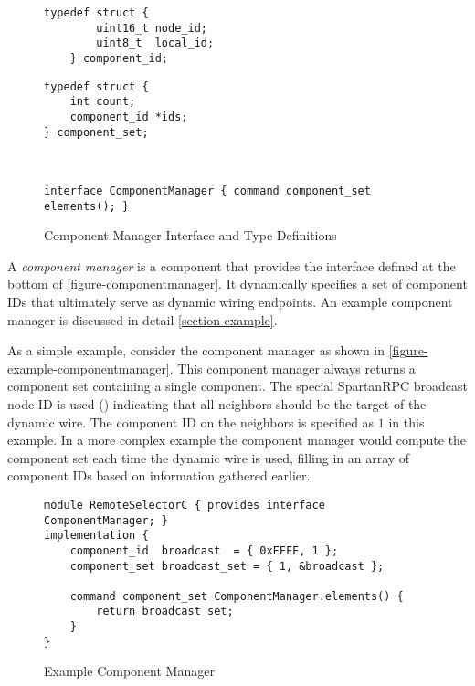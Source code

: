 \begin{figure}[!t]
\begin{textbox}{4in}
\begin{minipage}[t]{1.75in}
\begin{Verbatim}[fontsize=\small]
    typedef struct {
        uint16_t node_id;
        uint8_t  local_id;
    } component_id;
\end{Verbatim}
\end{minipage}
\hfill
\begin{minipage}[t]{1.75in}
\begin{Verbatim}[fontsize=\small]
typedef struct {
    int count;
    component_id *ids;
} component_set;
\end{Verbatim}
\end{minipage}
\\
\centering
\begin{minipage}[t]{5.8in}
\vspace{1.5em}
\begin{Verbatim}[fontsize=\small]
interface ComponentManager { command component_set elements(); }
\end{Verbatim}
\end{minipage}
\end{textbox}
\caption{Component Manager Interface and Type Definitions}
\label{figure-componentmanager}
\end{figure}

A \emph{component manager} is a component that provides the
 interface defined at the bottom of
\autoref{figure-componentmanager}. It dynamically specifies a set of
component IDs that ultimately serve as dynamic wiring endpoints. An
example component manager is discussed in detail
\autoref{section-example}.

As a simple example, consider the component manager
 as shown in
\autoref{figure-example-componentmanager}. This component manager always
returns a component set containing a single component. The special
SpartanRPC broadcast node ID is used () indicating that all
neighbors should be the target of the dynamic wire. The component ID on
the neighbors is specified as $1$ in this example. In a more complex
example the component manager would compute the component set each time
the dynamic wire is used, filling in an array of component IDs based on
information gathered earlier.

\begin{figure}[!t]
\begin{textbox}{4.0in}
\begin{Verbatim}[fontsize=\small]
module RemoteSelectorC { provides interface ComponentManager; }
implementation {
    component_id  broadcast  = { 0xFFFF, 1 };
    component_set broadcast_set = { 1, &broadcast };

    command component_set ComponentManager.elements() {
        return broadcast_set;
    }
}
\end{Verbatim}
\end{textbox}
\caption{Example Component Manager}
\label{figure-example-componentmanager}
\end{figure}

